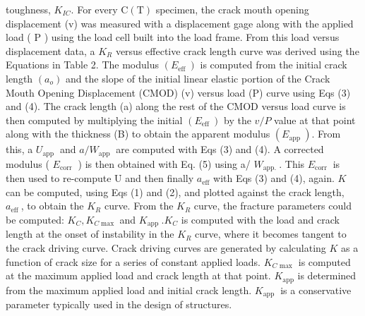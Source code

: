 \documentclass[10pt]{article}
\begin{document}
toughness, $K_{I C}$. For every $\mathrm{C}(\mathrm{T})$ specimen, the crack mouth opening displacement (v) was measured with a displacement gage along with the applied load ( $\mathrm{P}$ ) using the load cell built into the load frame. From this load versus displacement data, a $K_{R}$ versus effective crack length curve was derived using the Equations in Table 2. The modulus $\left(E_{\text {eff }}\right)$ is computed from the initial crack length $\left(a_{o}\right)$ and the slope of the initial linear elastic portion of the Crack Mouth Opening Displacement (CMOD) (v) versus load (P) curve using Eqs (3) and (4). The crack length (a) along the rest of the CMOD versus load curve is then computed by multiplying the initial $\left(E_{\text {eff }}\right)$ by the $v / P$ value at that point along with the thickness (B) to obtain the apparent modulus $\left(E_{\text {app }}\right)$. From this, a $U_{\text {app }}$ and $a / W_{\text {app }}$ are computed with Eqs (3) and (4). A corrected modulus ( $E_{\text {corr }}$ ) is then obtained with Eq. (5) using a/ $W_{\text {app. }}$. This $E_{\text {corr }}$ is then used to re-compute $\mathrm{U}$ and then finally $a_{\mathrm{eff}}$ with Eqs (3) and (4), again. $K$ can be computed, using Eqs (1) and (2), and plotted against the crack length, $a_{\text {eff }}$, to obtain the $K_{R}$ curve. From the $K_{R}$ curve, the fracture parameters could be computed: $K_{C}, K_{C \max }$ and $K_{\text {app }} . K_{C}$ is computed with the load and crack length at the onset of instability in the $K_{R}$ curve, where it becomes tangent to the crack driving curve. Crack driving curves are generated by calculating $K$ as a function of crack size for a series of constant applied loads. $K_{C \text { max }}$ is computed at the maximum applied load and crack length at that point. $K_{\mathrm{app}}$ is determined from the maximum applied load and initial crack length. $K_{\text {app }}$ is a conservative parameter typically used in the design of structures.
\end{document}
